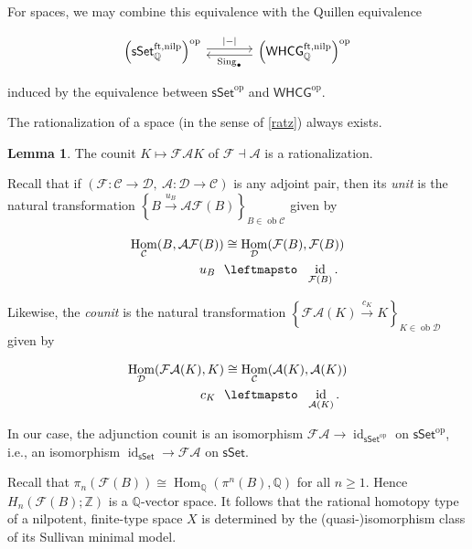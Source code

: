 \documentclass[10pt,letterpaper,cm]{nupset}
\theoremstyle{definition}
\theoremstyle{theorem}
\newtheorem{lemma}[defn]{Lemma}
\theoremstyle{remark}
\newcommand{\A}{\mathcal A}
\newcommand{\F}{\mathcal F}
\newcommand{\Q}{\mathbb Q}
\newcommand{\Z}{\mathbb Z}
\newcommand{\1}{\mathbb{1}}
\renewcommand{\c}{\mathcal{C}}
\renewcommand{\d}{\mathcal{D}}
\newcommand{\0}{\vec 0}
\DeclareMathOperator{\id}{id}
\DeclareMathOperator{\ft}{ft}
\DeclareMathOperator{\Hom}{Hom}
\DeclareMathOperator{\nilp}{nilp}
\DeclareMathOperator{\ob}{ob}
\DeclareMathOperator{\op}{op}
\DeclareMathOperator{\sing}{Sing}
\begin{document}
For spaces, we may combine this equivalence with the Quillen equivalence

\[
\begin{tikzcd}[column sep=large]
	{\left(\mathsf{sSet}_{\Q}^{\ft, \nilp}\right)^{\op}} & {\left(\mathsf{WHCG}_{\Q}^{\ft, \nilp}\right)^{\op}}
	\arrow["{\left\lvert{-}\right\rvert}", shift left=1, from=1-1, to=1-2]
	\arrow["{\sing_{\bullet}}", shift left=1, from=1-2, to=1-1]
\end{tikzcd}
\]

induced by the equivalence between $\mathsf{sSet}^{\op}$ and $\mathsf{WHCG}^{\op}$.

\medskip

The rationalization of a space (in the sense of \cref{ratz}) always exists.

\begin{lemma}
The counit $K \mapsto \F{\A{K}}$ of $\F \dashv \A$ is a rationalization.
\end{lemma}

Recall that if $\left(\F : \c \to \d,\ \A : \d \to \c \right)$ is any adjoint pair, then its \textit{unit} is the natural transformation \linebreak $\left\{B \xrightarrow{u_B} \A{\F(B)}\right\}_{B \in \ob{\c}}$ given by

\begin{align*}
\Hom_{\c}(B, \A{\F(B)}) &  \cong \Hom_{\d}(\F(B), \F(B))
\\ u_B \ \ & \leftmapsto \ \ \id_{\F(B)}.
\end{align*}

Likewise, the \textit{counit} is the natural transformation $\left\{\F{\A(K)} \xrightarrow{c_K} K \right\}_{K \in \ob{\d}}$ given by

\begin{align*}
\Hom_{\d}(\F{\A(K)}, K) &  \cong \Hom_{\c}(\A(K), \A(K))
\\ c_K \ \ & \leftmapsto \ \ \id_{\A(K)}.
\end{align*}

In our case, the adjunction counit is an isomorphism $\F{\A} \to \id_{\mathsf{sSet}^{\op}}$ on $\mathsf{sSet}^{\op}$, i.e., an isomorphism $ \id_{\mathsf{sSet}} \to \F{\A} $ on $\mathsf{sSet}$.

\medskip

Recall that $\pi_n(\F(B)) \cong \Hom_{\Q}(\pi^n(B), \Q)$ for all $n \geq 1$. Hence $H_n(\F(B); \Z)$ is a $\Q$-vector space. It follows that the rational homotopy type of a nilpotent, finite-type space $X$ is determined by the (quasi-)isomorphism class of its Sullivan minimal model. 
\end{document}

